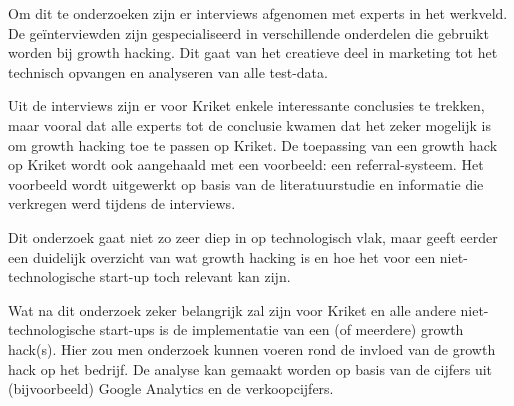 Om dit te onderzoeken zijn er interviews afgenomen met experts in het werkveld. De geïnterviewden zijn gespecialiseerd in verschillende onderdelen die gebruikt worden bij growth hacking. Dit gaat van het creatieve deel in marketing tot het technisch opvangen en analyseren van alle test-data. 

Uit de interviews zijn er voor Kriket enkele interessante conclusies te trekken, maar vooral dat alle experts tot de conclusie kwamen dat het zeker mogelijk is om growth hacking toe te passen op Kriket. De toepassing van een growth hack op Kriket wordt ook aangehaald met een voorbeeld: een referral-systeem. Het voorbeeld wordt uitgewerkt op basis van de literatuurstudie en informatie die verkregen werd tijdens de interviews. 

Dit onderzoek gaat niet zo zeer diep in op technologisch vlak, maar geeft eerder een duidelijk overzicht van wat growth hacking is en hoe het voor een niet-technologische start-up toch relevant kan zijn. 

Wat na dit onderzoek zeker belangrijk zal zijn voor Kriket en alle andere niet-technologische start-ups is de implementatie van een (of meerdere) growth hack(s). Hier zou men onderzoek kunnen voeren rond de invloed van de growth hack op het bedrijf. De analyse kan gemaakt worden op basis van de cijfers uit (bijvoorbeeld) Google Analytics en de verkoopcijfers.
